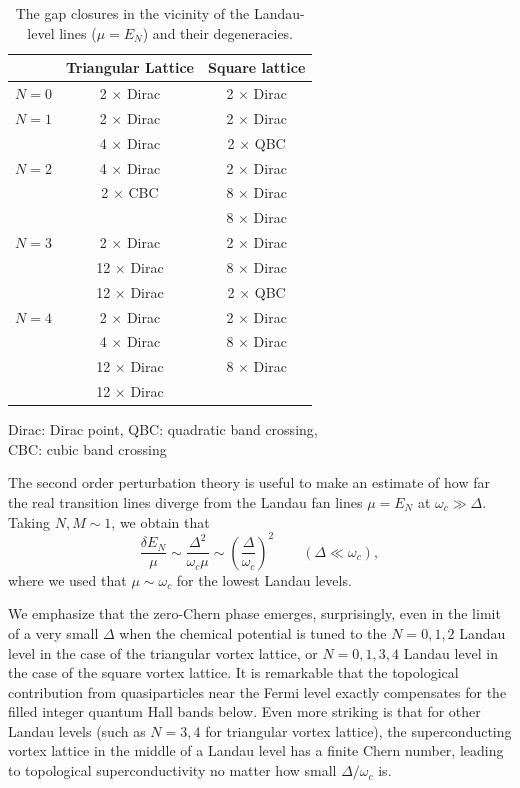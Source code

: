 \documentclass[10pt,prb,aps,superscriptaddress,amsmath,amssymb,twocolumn,floatfix,longbibliography]{revtex4-1}
\newcommand{\be}{\begin{equation} }
\newcommand{\ee}{\end{equation}}
\begin{document}
\begin{table}
\caption{
The gap closures in the vicinity of the Landau-level lines ($\mu = E_N$) and their degeneracies.}
	\label{tbl:zeros}
	\begin{ruledtabular}
	\begin{tabular}{ccc} 
	& Triangular Lattice & Square lattice \\
	\hline \hline
	$N = 0$ & 2 $\times$ Dirac & 2 $\times$ Dirac \\
    \hline
	$N = 1$ & 2 $\times$ Dirac & 2 $\times$ Dirac \\
	        & 4 $\times$ Dirac & 2 $\times$ QBC \\
    \hline
	$N = 2$ & 4 $\times$ Dirac & 2 $\times$ Dirac \\
	        & 2 $\times$ CBC & 8 $\times$ Dirac  \\
	        & &  8 $\times$ Dirac \\
    \hline
	$N = 3$ & 2 $\times$ Dirac & 2 $\times$ Dirac \\
	        & 12 $\times$ Dirac & 8 $\times$ Dirac \\
	        & 12 $\times$ Dirac  & 2 $\times$ QBC \\
    \hline
	$N = 4$ & 2 $\times$ Dirac & 2 $\times$ Dirac \\
	        & 4 $\times$ Dirac &  8 $\times$ Dirac \\
	        & 12 $\times$ Dirac &  8 $\times$ Dirac \\
	        & 12 $\times$ Dirac & \\
	\end{tabular}
	\end{ruledtabular}
    
    \vspace{0.2cm}
	Dirac: Dirac point, QBC: quadratic band crossing, \\ CBC: cubic band crossing 
\end{table}

The second order perturbation theory is useful to make an estimate of how far the real transition lines diverge from the Landau fan lines $\mu = E_N$ at $\omega_c \gg \Delta$. Taking $N,M \sim 1$, we obtain that 
\be
    \frac{\delta E_N}{\mu} \sim \frac{\Delta^2}{\omega_c \mu} \sim \left( \frac{\Delta}{\omega_c} \right)^2 \qquad (\Delta \ll \omega_c),
\ee
where we used that $\mu \sim \omega_c$ for the lowest Landau levels. 

We emphasize that the zero-Chern phase emerges, surprisingly, even in the limit of a very small $\Delta$ when the chemical potential is tuned to the $N=0,1,2$ Landau level in the case of the triangular vortex lattice, or $N=0,1,3,4$ Landau level in the case of the square vortex lattice. It is remarkable that the topological contribution from quasiparticles near the Fermi level exactly compensates for the filled integer quantum Hall bands below. Even more striking is that for other Landau levels (such as $N=3,4$ for triangular vortex lattice), the superconducting vortex lattice in the middle of a Landau level has a finite Chern number, leading to topological superconductivity no matter how small $\Delta / \omega_c$ is.
\end{document}
